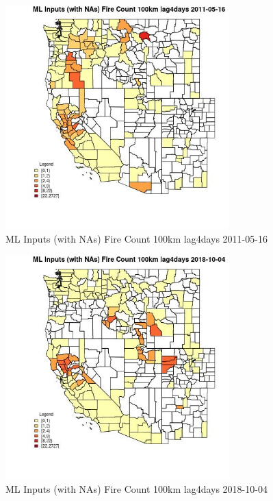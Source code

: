 \begin{figure} 
\centering  
\includegraphics[width=0.77\textwidth]{Code_Outputs/Report_ML_input_PM25_Step4_part_f_de_duplicated_aveswNAs_CountyFire_Count_100km_lag4daysMean2011-05-16.jpg} 
\caption{\label{fig:Report_ML_input_PM25_Step4_part_f_de_duplicated_aveswNAsCountyFire_Count_100km_lag4daysMean2011-05-16}ML Inputs (with NAs) Fire Count 100km lag4days 2011-05-16} 
\end{figure} 
 

\begin{figure} 
\centering  
\includegraphics[width=0.77\textwidth]{Code_Outputs/Report_ML_input_PM25_Step4_part_f_de_duplicated_aveswNAs_CountyFire_Count_100km_lag4daysMean2018-10-04.jpg} 
\caption{\label{fig:Report_ML_input_PM25_Step4_part_f_de_duplicated_aveswNAsCountyFire_Count_100km_lag4daysMean2018-10-04}ML Inputs (with NAs) Fire Count 100km lag4days 2018-10-04} 
\end{figure} 
 

